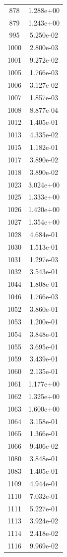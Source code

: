 \documentclass[12pt]{article}
\begin{document}
\begin{longtable}{@{}cc@{}}
878 & 1.288e+00 \\
879 & 1.243e+00 \\
995 & 5.250e-02 \\
1000 & 2.800e-03 \\
1001 & 9.272e-02 \\
1005 & 1.766e-03 \\
1006 & 3.127e-02 \\
1007 & 1.857e-03 \\
1008 & 8.877e-04 \\
1012 & 1.405e-01 \\
1013 & 4.335e-02 \\
1015 & 1.182e-01 \\
1017 & 3.890e-02 \\
1018 & 3.890e-02 \\
1023 & 3.024e+00 \\
1025 & 1.333e+00 \\
1026 & 1.420e+00 \\
1027 & 1.354e+00 \\
1028 & 4.684e-01 \\
1030 & 1.513e-01 \\
1031 & 1.297e-03 \\
1032 & 3.543e-01 \\
1044 & 1.808e-01 \\
1046 & 1.766e-03 \\
1052 & 3.860e-01 \\
1053 & 1.200e-01 \\
1054 & 3.848e-01 \\
1055 & 3.695e-01 \\
1059 & 3.439e-01 \\
1060 & 2.135e-01 \\
1061 & 1.177e+00 \\
1062 & 1.325e+00 \\
1063 & 1.600e+00 \\
1064 & 3.158e-01 \\
1065 & 1.366e-01 \\
1066 & 9.406e-02 \\
1080 & 3.848e-01 \\
1083 & 1.405e-01 \\
1109 & 4.944e-01 \\
1110 & 7.032e-01 \\
1111 & 5.227e-01 \\
1113 & 3.924e-02 \\
1114 & 2.418e-02 \\
1116 & 9.969e-02 \\

\end{longtable}
\end{document}
